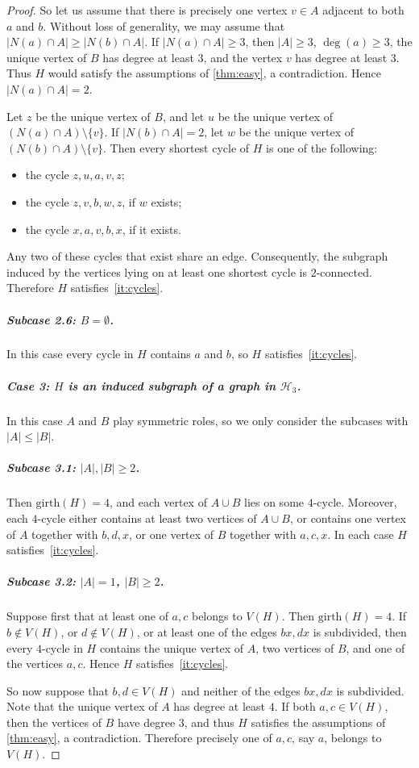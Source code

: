 \documentclass[a4paper,UKenglish,cleveref, autoref, thm-restate]{lipics-v2021}
\newcommand{\girth}{\mathrm{girth}}
\newcommand{\cH}{\mathcal{H}}
\begin{document}
\begin{proof}
So let us assume that there is precisely one vertex $v\in A$ adjacent to both $a$ and $b$.
Without loss of generality, we may assume that $|N(a)\cap A|\geq |N(b)\cap A|$.
If $|N(a)\cap A|\geq 3$, then $|A|\geq 3$, $\deg(a)\geq 3$, the unique vertex of $B$ has degree at least $3$, and the vertex $v$ has degree at least $3$.
Thus $H$ would satisfy the assumptions of \cref{thm:easy}, a contradiction.
Hence $|N(a)\cap A|=2$.

Let $z$ be the unique vertex of $B$, and let $u$ be the unique vertex of $(N(a)\cap A)\setminus \{v\}$.
If $|N(b)\cap A|=2$, let $w$ be the unique vertex of $(N(b)\cap A)\setminus \{v\}$.
Then every shortest cycle of $H$ is one of the following:
\begin{itemize}
    \item the cycle $z,u,a,v,z$;
    \item the cycle $z,v,b,w,z$, if $w$ exists;
    \item the cycle $x,a,v,b,x$, if it exists.
\end{itemize}
Any two of these cycles that exist share an edge.
Consequently, the subgraph induced by the vertices lying on at least one shortest cycle is $2$-connected.
Therefore $H$ satisfies~\ref{it:cycles}.

\subparagraph*{Subcase 2.6: \boldmath $B=\emptyset$.}
In this case every cycle in $H$ contains $a$ and $b$, so $H$ satisfies~\ref{it:cycles}.

\subparagraph*{Case 3: \boldmath $H$ is an induced subgraph of a graph in $\cH_3$.}
In this case $A$ and $B$ play symmetric roles, so we only consider the subcases with $|A|\leq |B|$.

\subparagraph*{Subcase 3.1: \boldmath $|A|,|B|\geq 2$.}
Then $\girth(H)=4$, and each vertex of $A\cup B$ lies on some $4$-cycle.
Moreover, each $4$-cycle either contains at least two vertices of $A\cup B$, or contains one vertex of $A$ together with $b,d,x$, or one vertex of $B$ together with $a,c,x$.
In each case $H$ satisfies~\ref{it:cycles}.

\subparagraph*{Subcase 3.2: \boldmath $|A|=1$, $|B|\geq 2$.}
Suppose first that at least one of $a,c$ belongs to $V(H)$.
Then $\girth(H)=4$.
If $b\notin V(H)$, or $d\notin V(H)$, or at least one of the edges $bx,dx$ is subdivided, then every $4$-cycle in $H$ contains the unique vertex of $A$, two vertices of $B$, and one of the vertices $a,c$.
Hence $H$ satisfies~\ref{it:cycles}.

So now suppose that $b,d\in V(H)$ and neither of the edges $bx,dx$ is subdivided.
Note that the unique vertex of $A$ has degree at least $4$.
If both $a,c\in V(H)$, then the vertices of $B$ have degree $3$, and thus $H$ satisfies the assumptions of \cref{thm:easy}, a contradiction.
Therefore precisely one of $a,c$, say $a$, belongs to $V(H)$.


\end{proof}
\end{document}
